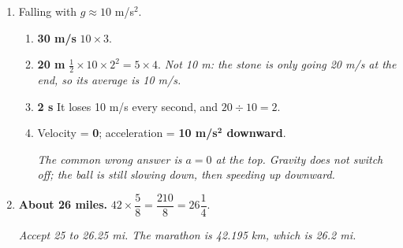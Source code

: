 \documentclass[12pt, twoside]{article}
\begin{document}
\begin{enumerate}[itemsep=0.3cm]
\item Falling with $g \approx 10$ m/s$^2$.
  \begin{enumerate}[itemsep=0.1cm]
    \item \textbf{30 m/s} \quad $10 \times 3$.
    \item \textbf{20 m} \quad $\frac{1}{2} \times 10 \times 2^2 = 5 \times 4$.
      \emph{Not 10 m: the stone is only going 20 m/s at the end, so its average is
      10 m/s.}
    \item \textbf{2 s} \quad It loses 10 m/s every second, and $20 \div 10 = 2$.
    \item Velocity = \textbf{0}; \quad acceleration = \textbf{10 m/s$^\mathbf{2}$
      downward}.

      \emph{The common wrong answer is $a = 0$ at the top. Gravity does not switch
      off; the ball is still slowing down, then speeding up downward.}
  \end{enumerate}

\item \textbf{About 26 miles.} \quad $42 \times \dfrac{5}{8} = \dfrac{210}{8}
  = 26\dfrac{1}{4}$.

  \emph{Accept 25 to 26.25 mi. The marathon is 42.195 km, which is 26.2 mi.}

\end{enumerate}
\end{document}

